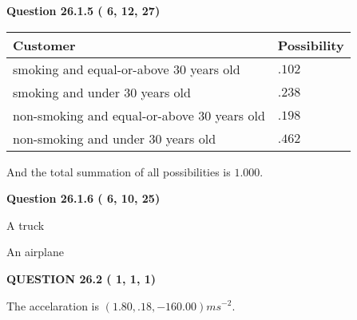 \documentclass[12pt]{article}
\begin{document}
{\textbf{\Large{Question
26.1.5 
 (          6,         12,         27)
}}}
  
  
 
 
\noindent{}

 
\noindent
\begin{tabular}{|l|l|}
\hline
Customer & Possibility \\
\hline
smoking  and  %
equal-or-above 30 years old &
  $ %
.102$ \\
\hline
smoking  and  %
under 30 years old &
  $ %
.238$ \\
\hline
 non-smoking and  %
equal-or-above 30 years old &
  $ %
.198$ \\
\hline
 non-smoking and  %
under 30 years old &
  $ %
.462$ \\
\hline
\end{tabular}
 
\noindent
 And the total summation of all possibilities is $  %
1.000 $.
 
 
 
  
\vspace{0.2in}
  
{\textbf{\Large{Question
26.1.6 
 (          6,         10,         25)
}}}
  
  
 
 
\noindent{}
 
 
A truck
 
 
An airplane
 
 
 
 
  
\vspace{0.2in}
  
{\textbf{\Large{QUESTION
26.2 
 (          1,          1,          1)
}}}
  
  


 
 
\noindent{}
 
 
The accelaration is $  %
(
1.80,
.18,
-160.00)
ms^{-2} $.
 
 
 
 
 
 
\noindent{}
\end{document}
